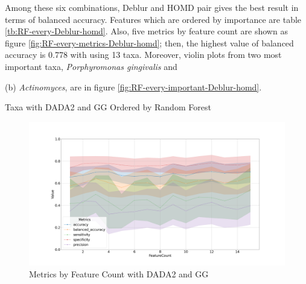 \documentclass[a4paper]{article}
\begin{document}
            Among these six combinations, Deblur and HOMD pair gives the best result in terms of balanced accuracy. Features which are ordered by importance are table \ref{tb:RF-every-Deblur-homd}. Also, five metrics by feature count are shown as figure \ref{fig:RF-every-metrics-Deblur-homd}; then, the highest value of balanced accuracy is 0.778 with using 13 taxa. Moreover, violin plots from two most important taxa, \textit{Porphyromonas gingivalis} and {(b) \textit{Actinomyces}, are in figure \ref{fig:RF-every-important-Deblur-homd}.

            \begin{table}[p]
                \centering
                \caption{Taxa with DADA2 and GG Ordered by Random Forest}
                \label{tb:RF-every-DADA2-gg}

            \end{table}

            \begin{figure}[p]
                \centering
                \includegraphics[width=0.7 \linewidth]{figures/RandomForest/ANCOM.DADA2.gg/metrics.png}
                \caption{Metrics by Feature Count with DADA2 and GG}
                \label{fig:RF-every-metrics-DADA2-gg}
            \end{figure}

}
\end{document}
